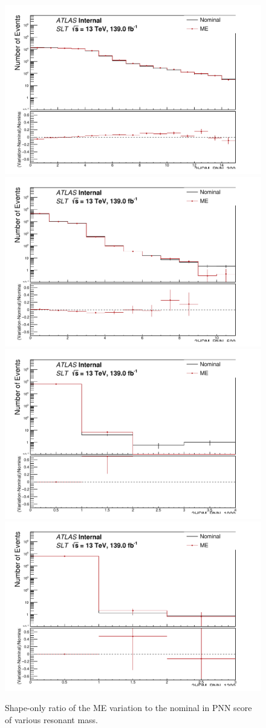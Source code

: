 \begin{figure}
\centering
\includegraphics[width=.41\textwidth]{figures/lephad_modelling_systs/SLT/ME/limit_binning_2HDM_PNN_300_Norm}
\includegraphics[width=.41\textwidth]{figures/lephad_modelling_systs/SLT/ME/limit_binning_2HDM_PNN_500_Norm}\\
\includegraphics[width=.41\textwidth]{figures/lephad_modelling_systs/SLT/ME/limit_binning_2HDM_PNN_1000_Norm}
\includegraphics[width=.41\textwidth]{figures/lephad_modelling_systs/SLT/ME/limit_binning_2HDM_PNN_1200_Norm}
\caption{Shape-only ratio of the ME variation to the nominal in PNN score of various resonant mass.}
\label{fig:ttbarsyst_lephad_ME_SLT_PNN}
\end{figure}


